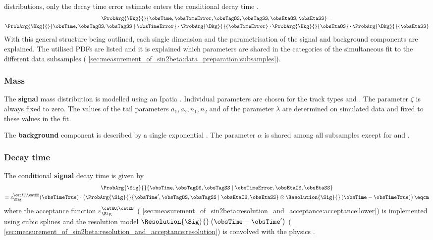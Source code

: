 distributions, only the decay time error estimate enters the conditional decay
time \PDF.
%
\begin{multline}
  \ProbArg{\Bkg}{}{\obsTime, \obsTimeError, \obsTagOS, \obsTagSS, \obsEtaOS, \obsEtaSS} = \\ 
  \ProbArg{\Bkg}{}{\obsTime, \obsTagOS, \obsTagSS \mid \obsTimeError} \cdot
  \ProbArg{\Bkg}{}{\obsTimeError} \cdot
  \ProbArg{\Bkg}{}{\obsEtaOS} \cdot
  \ProbArg{\Bkg}{}{\obsEtaSS}
\end{multline}
%
With this general structure being outlined, each single dimension and the
parametrisation of the signal and background components are explained. The
utilised \acp{PDF} are listed and it is explained which parameters are shared in
the categories of the simultaneous fit to the different data subsamples (\cf
\cref{sec:measurement_of_sin2beta:data_preparation:subsamples}).

\subsubsection{Mass}
\label{sec:measurement_of_sin2beta:likelihood_fit:model:mass}

The \textbf{signal} mass distribution is modelled using an Ipatia \PDF.
Individual parameters are chosen for the track types \catDD and \catLL. The
parameter $\zeta$ is always fixed to zero. The values of the tail parameters
$a_1, a_2, n_1, n_2$ and of the parameter $\lambda$ are determined on simulated
data and fixed to these values in the fit.

The \textbf{background} component is described by a single exponential \PDF. The
parameter $\alpha$ is shared among all subsamples except for \catDD and \catLL.

\subsubsection{Decay time}
\label{sec:measurement_of_sin2beta:likelihood_fit:model:decay_time}

The conditional \textbf{signal} decay time \PDF is given by
%
\begin{multline}
    \ProbArg{\Sig}{}{\obsTime, \obsTagOS, \obsTagSS \mid \obsTimeError, \obsEtaOS, \obsEtaSS} \\ 
  = \varepsilon_{\Sig}^{\text{\catAU,\catEB}}(\obsTimeTrue) \cdot \left(\ProbArg{\Sig}{}{\obsTime^\prime, \obsTagOS, \obsTagSS \mid \obsEtaOS, \obsEtaSS} \otimes \Resolution{\Sig}{}\left(\obsTime-\obsTimeTrue\right)\right)\eqcm
\end{multline}
%
where the acceptance function $\varepsilon_{\Sig}^{\text{\catAU,\catEB}}$ (\cf
\cref{sec:measurement_of_sin2beta:resolution_and_acceptance:acceptance:lower})
is implemented using cubic splines \cite{Karbach:2014qba} and the resolution
model $\Resolution{\Sig}{}\left(\obsTime-\obsTime^\prime\right)$ (\cf
\cref{sec:measurement_of_sin2beta:resolution_and_acceptance:resolution}) is
convolved with the \B physics \PDF.

